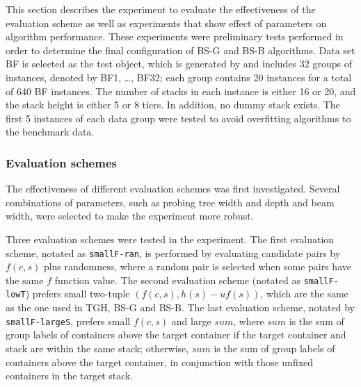 \documentclass[review,3p,times,authoryear,12pt]{elsarticle}
\begin{document}
This section describes the experiment to evaluate the effectiveness of the evaluation scheme as well as experiments that show effect of parameters on algorithm performance. 
These experiments were preliminary tests performed in order to determine the final configuration of BS-G and BS-B algorithms. Data set BF is selected as the test object, which is generated by \cite{BF2012} and includes 32 groups of instances, denoted by BF1, \dots, BF32; each group contains 20 instances for a total of 640 BF instances. 
The number of stacks in each instance is either 16 or 20, and the stack height is either 5 or 8 tiers. 
In addition, no dummy stack exists. 
The first 5 instances of each data group were tested to avoid overfitting algorithms to the benchmark data.

\subsubsection{Evaluation schemes}

The effectiveness of different evaluation schemes was first investigated. 
Several combinations of parameters, such as probing tree width and depth and beam width, were selected to make the experiment more robust.

Three evaluation schemes were tested in the experiment. 
The first evaluation scheme, notated as \texttt{smallF-ran}, is performed by evaluating candidate pairs by $f(c,s)$ plus randomness, where a random pair is selected when some pairs have the same $f$ function value. 
The second evaluation scheme (notated as \texttt{smallF-lowT}) prefers small two-tuple $(f(c,s),h(s)-\mathit{uf}(s))$, which are the same as the one used in TGH, BS-G and BS-B. 
The last evaluation scheme, notated by \texttt{smallF-largeS}, prefers small $f(c,s)$ and large $\mathit{sum}$, where $\mathit{sum}$ is the sum of group labels of containers above the target container if the target container and stack are within the same stack; otherwise, $\mathit{sum}$ is the sum of group labels of containers above the target container, in conjunction with those unfixed containers in the target stack.
\end{document}

